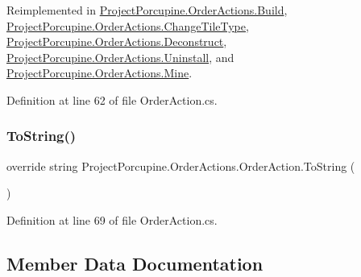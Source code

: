Reimplemented in \hyperlink{class_project_porcupine_1_1_order_actions_1_1_build_a84f7280320250c7f7084b8c58693be58}{Project\+Porcupine.\+Order\+Actions.\+Build}, \hyperlink{class_project_porcupine_1_1_order_actions_1_1_change_tile_type_aa62d98bcc6471aba77a9c3847e59a993}{Project\+Porcupine.\+Order\+Actions.\+Change\+Tile\+Type}, \hyperlink{class_project_porcupine_1_1_order_actions_1_1_deconstruct_a923875ef4803626e5ee1b627ff32d100}{Project\+Porcupine.\+Order\+Actions.\+Deconstruct}, \hyperlink{class_project_porcupine_1_1_order_actions_1_1_uninstall_a870ae2bac8212aab9b722f294725db45}{Project\+Porcupine.\+Order\+Actions.\+Uninstall}, and \hyperlink{class_project_porcupine_1_1_order_actions_1_1_mine_a29675aa68437639392e77e821700b24e}{Project\+Porcupine.\+Order\+Actions.\+Mine}.



Definition at line 62 of file Order\+Action.\+cs.

\mbox{\label{class_project_porcupine_1_1_order_actions_1_1_order_action_a378731f7ccc8444488452f21641e0e20}} 
\subsubsection{\texorpdfstring{To\+String()}{ToString()}}
{\footnotesize\ttfamily override string Project\+Porcupine.\+Order\+Actions.\+Order\+Action.\+To\+String (\begin{DoxyParamCaption}{ }\end{DoxyParamCaption})}



Definition at line 69 of file Order\+Action.\+cs.



\subsection{Member Data Documentation}
\mbox{\label{class_project_porcupine_1_1_order_actions_1_1_order_action_a9fae61c3d49ebe1483f910c7bebd0dfa}} 
